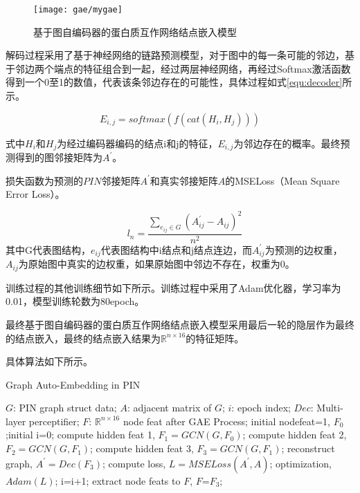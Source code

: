 \begin{figure}[htbp]
    \centering
    \texttt{[image: gae/mygae]}
    \caption{基于图自编码器的蛋白质互作网络结点嵌入模型}
    \label{fig:gae/mygae}
\end{figure}

解码过程采用了基于神经网络的链路预测模型，对于图中的每一条可能的邻边，基于邻边两个端点的特征组合到一起，经过两层神经网络，再经过Softmax激活函数得到一个0至1的数值，代表该条邻边存在的可能性，具体过程如式\ref{equ:decoder}所示。

\begin{equation}
    \label{equ:decoder}
    E_{i,j} =softmax(f(cat(H_i,H_j)))
\end{equation}

式中$H_i$和$H_j$为经过编码器编码的结点i和j的特征，$E_{i,j}$为邻边存在的概率。最终预测得到的图邻接矩阵为$A^{\prime}$。


损失函数为预测的$PIN$邻接矩阵$A^{\prime}$和真实邻接矩阵$A$的MSELoss（Mean Square Error Loss）。

\begin{equation}
    \label{equ:autoembedloss}
    \quad l_n =\frac{\sum_{e_{ij}\in G}{  \left( A_{ij}^{\prime} - A_{ij} \right)^2}}{n^2}
\end{equation}
其中G代表图结构，$e_{ij}$代表图结构中i结点和j结点连边，而$A_{ij}^{\prime}$为预测的边权重，$A_{ij}$为原始图中真实的边权重，如果原始图中邻边不存在，权重为0。


训练过程的其他训练细节如下所示。训练过程中采用了Adam优化器，学习率为0.01，模型训练轮数为80epoch。

最终基于图自编码器的蛋白质互作网络结点嵌入模型采用最后一轮的隐层作为最终的结点嵌入，最终的结点嵌入结果为$\mathbb{R}^{n\times 16}$的特征矩阵。

具体算法如下所示。
\begin{algorithm}[h]
    \caption{Graph Auto-Embedding in PIN} %
    \label{alg::gae}
    \begin{algorithmic}
        \Require
        $G$: PIN graph struct data;
        $A$: adjacent matrix of $G$;
        $i$: epoch index;
        $Dec$: Multi-layer perceptifier;
        \Ensure
        $F$: $\mathbb{R}^{n\times 16}$ node feat after GAE Process;
        \State initial nodefeat=1, $F_0$;initial i=0;
        \Repeat
        \State compute hidden feat 1, $F_1=GCN(G,F_0)$;
        \State compute hidden feat 2, $F_2=GCN(G,F_1)$;
        \State compute hidden feat 3, $F_3=GCN(G,F_1)$;
        \State reconstruct graph, $A^{\prime}=Dec(F_3)$;
        \State compute loss, $L=MSELoss(A^{\prime},A)$;
        \State optimization, $Adam(L)$;
        \State i=i+1;
        \State extract node feats to $F$, $F$=$F_3$;
    \end{algorithmic}
\end{algorithm}

